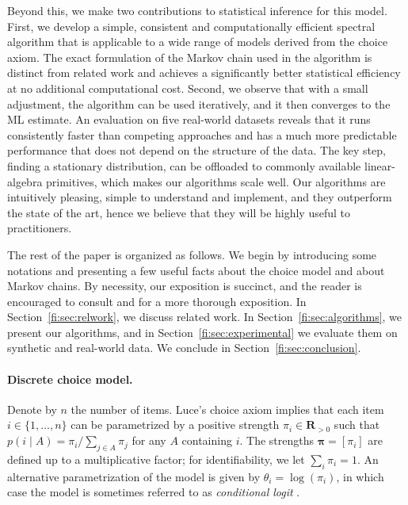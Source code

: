 Beyond this, we make two contributions to statistical inference for this model.
First, we develop a simple, consistent and computationally efficient spectral algorithm that is applicable to a wide range of models derived from the choice axiom.
The exact formulation of the Markov chain used in the algorithm is distinct from related work \citep{negahban2012iterative, azari2013generalized} and achieves a significantly better statistical efficiency at no additional computational cost.
Second, we observe that with a small adjustment, the algorithm can be used iteratively, and it then converges to the ML estimate.
An evaluation on five real-world datasets reveals that it runs consistently faster than competing approaches and has a much more predictable performance that does not depend on the structure of the data.
The key step, finding a stationary distribution, can be offloaded to commonly available linear-algebra primitives, which makes our algorithms  scale well.
Our algorithms are intuitively pleasing, simple to understand and implement, and they outperform the state of the art, hence we believe that they will be highly useful to practitioners.

The rest of the paper is organized as follows.
We begin by introducing some notations and presenting a few useful facts about the choice model and about Markov chains.
By necessity, our exposition is succinct, and the reader is encouraged to consult \citet{luce1959individual} and \citet{levin2008markov} for a more thorough exposition.
In Section~\ref{fi:sec:relwork}, we discuss related work.
In Section~\ref{fi:sec:algorithms}, we present our algorithms, and in Section~\ref{fi:sec:experimental} we evaluate them on synthetic and real-world data.
We conclude in Section~\ref{fi:sec:conclusion}.


\paragraph{Discrete choice model.}
Denote by $n$ the number of items.
Luce's choice axiom implies that each item $i \in \{1, \ldots, n\}$ can be parametrized by a positive strength $\pi_i \in \mathbf{R}_{>0}$ such that $p(i \mid A) = \pi_i / \sum_{j \in A} \pi_j$ for any $A$ containing $i$.
The strengths $\bm{\pi} = [\pi_i]$ are defined up to a multiplicative factor;
for identifiability, we let $\sum_i \pi_i = 1$.
An alternative parametrization of the model is given by $\theta_i = \log(\pi_i)$, in which case the model is sometimes referred to as \emph{conditional logit} \citep{mcfadden1973conditional}.


